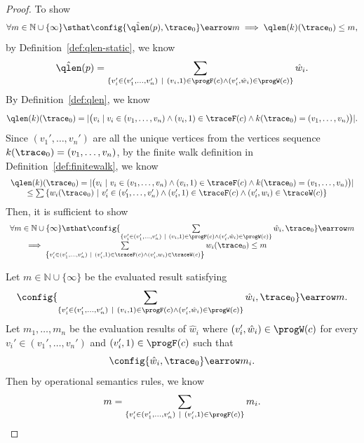 \begin{proof}
\subcaseL{}
To show 
$$
\forall  m \in \mathbb{N} \cup \{\infty\} \sthat
\config{\hat{\qlen}(p), \trace_0} \earrow m
\implies 
 \qlen(k)(\trace_0) \leq m, $$
by Definition~\ref{def:qlen-static}, we know
\[
	\hat{\qlen}(p) = \sum\limits_{ 
		\{ v_i' \in (v_1', \ldots, v_n') ~\vert~  (v_i, 1) \in \progF(c) \land (v_i', \hat{w}_i) \in \progW(c) \} 
		} 
		\hat{w}_i.
\]
By Definition~\ref{def:qlen}, we know
\[
	\qlen(k)(\trace_0) = |\big( v_i \mid v_i \in (v_1, \ldots, v_{n}) \land (v_i, 1) \in \traceF(c)
	  \land k(\trace_0) = (v_1, \ldots, v_{n}) \big)|.
\]
Since $(v_1', \ldots, v_n')$ are all the unique vertices from 
the vertices sequence $k(\trace_0) = (v_1, \ldots, v_n)$,
by the finite walk definition in Definition~\ref{def:finitewalk}, we know
\[
	\begin{array}{l}
		\qlen(k)(\trace_0) = 
		|\big(  v_i  ~\vert~  v_i \in (v_1, \ldots, v_{n}) \land (v_i, 1) \in \traceF(c)
		\land k(\trace_0) = (v_1, \ldots, v_{n}) \big)|
		\\ \qquad \leq 
	  \sum\left\{ 
			w_i(\trace_0) ~\vert~ 
			v_i' \in (v_1', \ldots, v_n') \land (v_i', 1) \in \traceF(c) 
			\land (v_i', w_i) \in \traceW(c) 
	  \right\}
	\end{array}
\]
Then, it is sufficient to show
\[
	\begin{array}{l}
		\forall m \in \mathbb{N} \cup \{\infty\} \sthat
		\config{\sum\limits_{ 
		\{  v_i' \in (v_1', \ldots, v_n') ~\vert~  (v_i, 1) \in \progF(c) \land (v_i', \hat{w}_i) \in \progW(c)\} } 
		\hat{w}_i, \trace_0} \earrow m
		\\ \qquad 
		\implies
		\sum\limits_{\left\{v_i' \in (v_1', \ldots, v_n') ~\vert~ (v_i', 1) \in \traceF(c) \land (v_i', w_i) \in \traceW(c) 
	  \right\}} w_i(\trace_0)
	  \leq m
	\end{array}
	\]


Let $m \in \mathbb{N} \cup \{\infty\} $ be the evaluated result satisfying 
$$
\config{\sum\limits_{ 
	\{ v_i' \in (v_1', \ldots, v_n') ~\vert~  (v_i, 1) \in \progF(c) \land (v_i', \hat{w}_i) \in \progW(c)\} } 
	\hat{w}_i, \trace_0} \earrow m.
$$
Let $m_1, \ldots, m_n$ be the evaluation results of
	$\hat{w}_i$ where $(v_i', \hat{w}_i) \in \progW(c)$ for every $v_i' \in (v_1', \ldots, v_n')$ and $(v_i', 1) \in \progF(c)$ 
	such that 
	\[
		\config{\hat{w}_i, \trace_0} \earrow m_i.
	\]
Then by operational semantics rules, we know 
\[
	m = \sum\limits_{ 
		\{ v_i' \in (v_1', \ldots, v_n') ~\vert~  (v_i', 1) \in \progF(c) \} } m_i.
\]


\end{proof}
